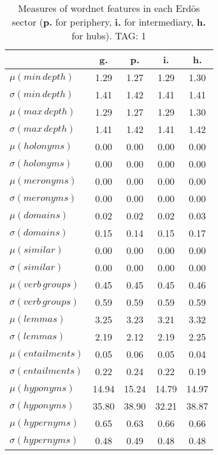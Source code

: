 \begin{table}[h!]
\begin{center}
\begin{tabular}{| l | c | c | c | c |}\hline
 & g. & p. & i. & h. \\\hline
$\mu(min\,depth)$ & 1.29  & 1.27  & 1.29  & 1.30 \\\hline
$\sigma(min\,depth)$ & 1.41  & 1.42  & 1.41  & 1.41 \\\hline
$\mu(max\,depth)$ & 1.29  & 1.27  & 1.29  & 1.30 \\\hline
$\sigma(max\,depth)$ & 1.41  & 1.42  & 1.41  & 1.42 \\\hline
$\mu(holonyms)$ & 0.00  & 0.00  & 0.00  & 0.00 \\\hline
$\sigma(holonyms)$ & 0.00  & 0.00  & 0.00  & 0.00 \\\hline
$\mu(meronyms)$ & 0.00  & 0.00  & 0.00  & 0.00 \\\hline
$\sigma(meronyms)$ & 0.00  & 0.00  & 0.00  & 0.00 \\\hline
$\mu(domains)$ & 0.02  & 0.02  & 0.02  & 0.03 \\\hline
$\sigma(domains)$ & 0.15  & 0.14  & 0.15  & 0.17 \\\hline
$\mu(similar)$ & 0.00  & 0.00  & 0.00  & 0.00 \\\hline
$\sigma(similar)$ & 0.00  & 0.00  & 0.00  & 0.00 \\\hline
$\mu(verb\,groups)$ & 0.45  & 0.45  & 0.45  & 0.46 \\\hline
$\sigma(verb\,groups)$ & 0.59  & 0.59  & 0.59  & 0.59 \\\hline
$\mu(lemmas)$ & 3.25  & 3.23  & 3.21  & 3.32 \\\hline
$\sigma(lemmas)$ & 2.19  & 2.12  & 2.19  & 2.25 \\\hline
$\mu(entailments)$ & 0.05  & 0.06  & 0.05  & 0.04 \\\hline
$\sigma(entailments)$ & 0.22  & 0.24  & 0.22  & 0.19 \\\hline
$\mu(hyponyms)$ & 14.94  & 15.24  & 14.79  & 14.97 \\\hline
$\sigma(hyponyms)$ & 35.80  & 38.90  & 32.21  & 38.87 \\\hline
$\mu(hypernyms)$ & 0.65  & 0.63  & 0.66  & 0.66 \\\hline
$\sigma(hypernyms)$ & 0.48  & 0.49  & 0.48  & 0.48 \\\hline
\end{tabular}
\caption{Measures of wordnet features in each Erd\"os sector ({{\bf p.}} for periphery, {{\bf i.}} for intermediary, {{\bf h.}} for hubs). TAG: 1}
\end{center}
\end{table}